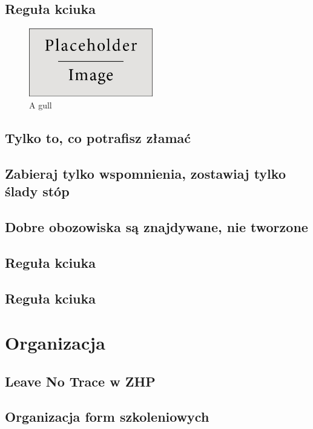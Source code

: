 \documentclass[11pt,fleqn]{book} %
\begin{document}
\section{Reguła kciuka}\label{regula-kciuka}
\lipsum
\begin{figure}
	\begin{center}
		\includegraphics[width=0.48\textwidth]{Pictures/placeholder}
	\end{center}
	\caption{A gull}
\end{figure}

\section{Tylko to, co potrafisz złamać}\label{regula-drewno}
\section{Zabieraj tylko wspomnienia, zostawiaj tylko ślady stóp}\label{regula-zabierz-zostaw}
\section{Dobre obozowiska są znajdywane, nie tworzone}\label{regula-dobre-obozowiska}
\section{Reguła kciuka}\label{regula-kciuka}
\section{Reguła kciuka}\label{regula-kciuka}

\chapter{Organizacja}

\section{Leave No Trace w ZHP}

\section{Organizacja form szkoleniowych}
\end{document}
